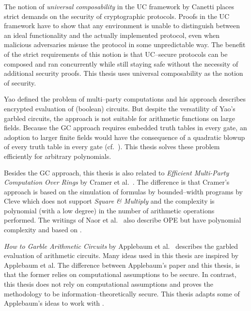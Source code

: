 %
%
\label{sec:related-work}

The notion of \emph{universal composability} in the UC framework by Canetti
\cite{canetti05} places strict demands on the security of cryptographic
protocols. Proofs in the UC framework have to show that any environment is
unable to distinguish between an ideal functionality and the actually
implemented protocol, even when malicious adversaries misuse the protocol in
some unpredictable way. The benefit of the strict requirements of this notion is
that UC--secure protocols can be composed and ran concurrently while still
staying safe without the necessity of additional security proofs. This thesis
uses universal composability as the notion of security.

Yao defined the problem of multi--party computations and his  approach \cite{yao86} describes encrypted evaluation of (boolean)
circuits. But despite the versatility of Yao's garbled circuits, the approach is
not suitable for arithmetic functions on large fields. Because the GC approach
requires embedded truth tables in every gate, an adoption to larger finite
fields would have the consequence of a quadratic blowup of every truth table in
every gate (cf.\ \cite{naor99privacy}). This thesis solves these problem
efficiently for arbitrary polynomials.

Besides the GC approach, this thesis is also related to \emph{Efficient
Multi-Party Computation Over Rings} by Cramer et al.\ \cite{cramer03}. The
difference is that Cramer's approach is based on the simulation of formulas by
bounded--width programs by Cleve \cite{cleve91} which does not support
\emph{Square \& Multiply} \cite{knuth81} and the complexity is polynomial (with
a low degree) in the number of arithmetic operations performed. The writings of
Naor et al.\ \cite{naor99,naor06} also describe OPE but have polynomial
complexity and based on  \cite{rabin81}.

\emph{How to Garble Arithmetic Circuits} by Applebaum et al.\ \cite{gac2012}
describes the garbled evaluation of arithmetic circuits.  Many ideas used in
this thesis are inspired by Applebaum et al. The difference between Applebaum's
paper and this thesis, is that the former relies on computational assumptions to
be secure. In contrast, this thesis does not rely on computational assumptions
and proves the methodology to be information--theoretically secure. This thesis
adapts some of Applebaum's ideas to work with  \cite{davidgoliath}.

